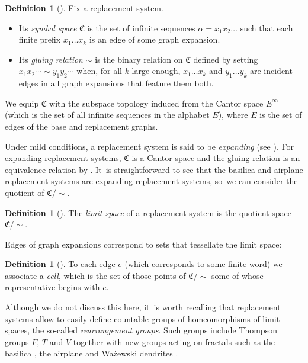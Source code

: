 \documentclass[JEP,XML,SOM,Unicode,NoFloatCountersInSection,published]{cedram}
\theoremstyle{plain}
\theoremstyle{definition}
\newtheorem{definition}[theorem]{Definition}
\theoremstyle{remark}
\begin{document}
\begin{definition}[{\cite[Defs.\,1.6 \& 1.7]{Belk-Forrest}}]
Fix a replacement system.
\begin{itemize}
\item Its \emph{symbol space} $\mathfrak{C}$ is the set of infinite sequences $\alpha = x_1 x_2 \dots$ such that each finite prefix $x_1 \dots x_k$ is an edge of some graph expansion.
\item Its \emph{gluing relation} $\sim$ is the binary relation on $\mathfrak{C}$ defined by setting $x_1 x_2 \cdots \sim y_1 y_2 \cdots$ when, for all $k$ large enough, $x_1 \dots x_k$ and $y_1 \dots y_k$ are incident edges in all graph expansions that feature them both.
\end{itemize}
We equip $\mathfrak{C}$ with the subspace topology induced from the Cantor space $E^\infty$ (which is the set of all infinite sequences in the alphabet $E$), where $E$ is the set of edges of the base and replacement graphs.
\end{definition}

Under mild conditions, a replacement system is said to be \textit{expanding} (see \cite[Def.\,1.8]{Belk-Forrest}).
For expanding replacement systems, $\mathfrak{C}$ is a Cantor space and the gluing relation is an equivalence relation by \cite[Prop.\,1.9]{Belk-Forrest}. It~is straightforward to see that the basilica and airplane replacement systems are expanding replacement systems, so~we can consider the quotient of $\mathfrak{C}/\sim$.

\begin{definition}[{\cite[Def.\,1.7]{Belk-Forrest}}]
The \emph{limit space} of a replacement system is the quotient space $\mathfrak{C}/\sim$.
\end{definition}

Edges of graph expansions correspond to sets that tessellate the limit space:

\begin{definition}[{\cite[Def.\,1.13]{Belk-Forrest}}]

To each edge $e$ (which corresponds to some finite word) we associate a \emph{cell}, which is the set of those points of $\mathfrak{C}/\sim$ some of whose representative begins with $e$.
\end{definition}

Although we do not discuss this here, it~is worth recalling that replacement systems allow to easily define countable groups of homeomorphisms of limit spaces, the so-called \textit{rearrangement groups}.
Such groups include Thompson groups $F$, $T$ and $V$ together with new groups acting on fractals such as the basilica \cite{BF15}, the airplane \cite{airplane} and Ważewski dendrites \cite{dendriterearrangement}.\enlargethispage{.5\baselineskip}
\end{document}
